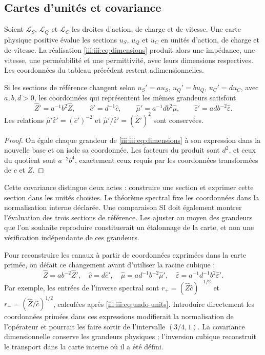 \subsection{Cartes d’unités et covariance}

Soient $\mathcal L_S$, $\mathcal L_Q$ et $\mathcal L_C$ les droites
d’action, de charge et de vitesse. Une carte physique positive évalue les sections
$u_S$, $u_Q$ et $u_C$ en unités d’action, de charge et de vitesse. La réalisation
\eqref{iii:iii:eq:dimensions} produit alors une impédance, une vitesse,
une perméabilité et une permittivité, avec leurs dimensions respectives.
Les coordonnées du tableau précédent restent adimensionnelles.

\begin{proposition}
Si les sections de référence changent selon
$u_S'=a u_S$, $u_Q'=b u_Q$, $u_C'=d u_C$, avec $a,b,d>0$, les
coordonnées qui représentent les mêmes grandeurs satisfont
\[
 \widehat Z'=a^{-1}b^2\widehat Z,\qquad
 \widehat c'=d^{-1}\widehat c,\qquad
 \widehat\mu'=a^{-1}db^2\widehat\mu,\qquad
 \widehat\varepsilon'=adb^{-2}\widehat\varepsilon.
\]
Les relations $\widehat\mu'\widehat\varepsilon'=(\widehat c')^{-2}$
et $\widehat\mu'/\widehat\varepsilon'=(\widehat Z')^2$ sont conservées.
\end{proposition}
\begin{proof}
On égale chaque grandeur de \eqref{iii:iii:eq:dimensions} à son expression
dans la nouvelle base et on isole sa coordonnée. Les facteurs du produit
sont $d^2$, et ceux du quotient sont $a^{-2}b^4$, exactement ceux requis
par les coordonnées transformées de $c$ et $Z$.
\end{proof}

Cette covariance distingue deux actes : construire une section et exprimer
cette section dans les unités choisies. Le théorème spectral fixe les coordonnées
dans la normalisation interne déclarée. Une comparaison SI doit également montrer
l’évaluation des trois sections de référence. Les ajuster
au moyen des grandeurs que l’on souhaite reproduire constituerait un étalonnage de
la carte, et non une vérification indépendante de ces grandeurs.

Pour reconstruire les canaux à partir de coordonnées exprimées dans la carte
primée, on défait ce changement avant d’utiliser la racine cubique :
\begin{equation}
 \widehat Z=ab^{-2}\widehat Z',\quad
 \widehat c=d\widehat c',\quad
 \widehat\mu=ad^{-1}b^{-2}\widehat\mu',\quad
 \widehat\varepsilon=a^{-1}d^{-1}b^2\widehat\varepsilon'.
 \label{iii:iii:eq:undo-units}
\end{equation}
Par exemple, les entrées de l’inverse spectral sont
$r_+=(\widehat Z\widehat c)^{-1/2}$ et
$r_-=(\widehat Z/\widehat c)^{1/2}$, calculées après
\eqref{iii:iii:eq:undo-units}. Introduire directement les coordonnées primées
dans ces expressions modifierait la normalisation de l’opérateur et pourrait
les faire sortir de l’intervalle $(3/4,1)$. La covariance dimensionnelle conserve
les grandeurs physiques ; l’inversion cubique reconstruit le transport
dans la carte interne où il a été défini.

